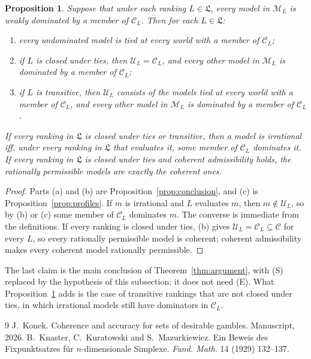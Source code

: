 \documentclass[11pt]{article}
\newtheorem{proposition}[theorem]{Proposition}
\theoremstyle{definition}
\newcommand{\M}{\mathcal M}
\newcommand{\C}{\mathcal C}
\newcommand{\U}{\mathcal U}
\newcommand{\Lf}{\mathfrak L}
\begin{document}
\begin{proposition}\label{prop:permissible}
Suppose that under each ranking $L\in\Lf$, every model in $\M_L$ is weakly dominated by a member of $\C_L$. Then for each $L\in\Lf$:
\begin{enumerate}[label=(\alph*)]
\item every undominated model is tied at every world with a member of $\C_L$;
\item if $L$ is closed under ties, then $\U_L=\C_L$, and every other model in $\M_L$ is dominated by a member of $\C_L$;
\item if $L$ is transitive, then $\U_L$ consists of the models tied at every world with a member of $\C_L$, and every other model in $\M_L$ is dominated by a member of $\C_L$.
\end{enumerate}
If every ranking in $\Lf$ is closed under ties or transitive, then a model is irrational iff, under every ranking in $\Lf$ that evaluates it, some member of $\C_L$ dominates it. If every ranking in $\Lf$ is closed under ties and coherent admissibility holds, the rationally permissible models are exactly the coherent ones.
\end{proposition}
\begin{proof}
Parts (a) and (b) are Proposition~\ref{prop:conclusion}, and (c) is Proposition~\ref{prop:profiles}. If $m$ is irrational and $L$ evaluates $m$, then $m\notin\U_L$, so by (b) or (c) some member of $\C_L$ dominates $m$. The converse is immediate from the definitions. If every ranking is closed under ties, (b) gives $\U_L=\C_L\subseteq\C$ for every $L$, so every rationally permissible model is coherent; coherent admissibility makes every coherent model rationally permissible.
\end{proof}
The last claim is the main conclusion of Theorem~\ref{thm:argument}, with (S) replaced by the hypothesis of this subsection; it does not need (E). What Proposition~\ref{prop:permissible} adds is the case of transitive rankings that are not closed under ties, in which irrational models still have dominators in $\C_L$.

\begin{thebibliography}{9}
 J.~Konek. Coherence and accuracy for sets of desirable gambles. Manuscript, 2026.
 B.~Knaster, C.~Kuratowski and S.~Mazurkiewicz. Ein Beweis des Fixpunktsatzes f\"ur $n$-dimensionale Simplexe. \emph{Fund. Math.} 14 (1929) 132--137.
\end{thebibliography}
\end{document}
